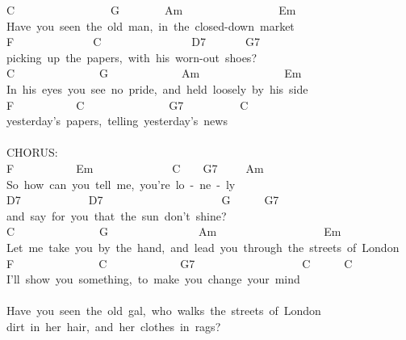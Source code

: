 \documentclass[]{book}
\begin{document}
C~~~~~~~~~~~~~~~~~G~~~~~~~~Am~~~~~~~~~~~~~~~~~Em\\
Have~you~seen~the~old~man,~in~the~closed-down~market\\
F~~~~~~~~~~~~~~C~~~~~~~~~~~~~~~~D7~~~~~~~G7\\
picking~up~the~papers,~with~his~worn-out~shoes?\\
C~~~~~~~~~~~~~~~G~~~~~~~~~~~~~Am~~~~~~~~~~~~~~~Em\\
In~his~eyes~you~see~no~pride,~and~held~loosely~by~his~side\\
F~~~~~~~~~~~C~~~~~~~~~~~~~~~G7~~~~~~~~~~C\\
yesterday's~papers,~telling~yesterday's~news\\
~\\
CHORUS:\\
\hspace*{0.333em}\hspace*{0.333em}\hspace*{0.333em}\hspace*{0.333em}\hspace*{0.333em}\hspace*{0.333em}F~~~~~~~~~~~Em~~~~~~~~~~~~~~C~~~~G7~~~~~Am\\
\hspace*{0.333em}\hspace*{0.333em}\hspace*{0.333em}\hspace*{0.333em}So~how~can~you~tell~me,~you're~lo~-~ne~-~ly\\
D7~~~~~~~~~~~~D7~~~~~~~~~~~~~~~~~~~~~G~~~~~~G7\\
\hspace*{0.333em}\hspace*{0.333em}and~say~for~you~that~the~sun~don't~shine?\\
C~~~~~~~~~~~~~~~G~~~~~~~~~~~~~~~~Am~~~~~~~~~~~~~~~~~~~Em\\
Let~me~take~you~by~the~hand,~and~lead~you~through~the~streets~of~London\\
F~~~~~~~~~~~~~~~C~~~~~~~~~~~~~G7~~~~~~~~~~~~~~~~~~~C~~~~~~C\\
\hspace*{0.333em}\hspace*{0.333em}I'll~show~you~something,~to~make~you~change~your~mind\\
~\\
Have~you~seen~the~old~gal,~who~walks~the~streets~of~London\\
dirt~in~her~hair,~and~her~clothes~in~rags?\\
\end{document}
